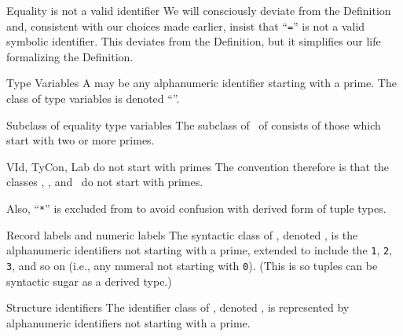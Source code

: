 \begin{deviation}{Equality is not a valid identifier}
We will consciously deviate from the Definition and, consistent with our
choices made earlier, insist that ``\texttt{=}'' is not a valid symbolic
identifier. This deviates from the Definition, but it simplifies our
life formalizing the Definition.
\end{deviation}

\begin{definition}{Type Variables}
A  may be any alphanumeric identifier starting
with a prime. The class of type variables is denoted ``{\TyVar}''.
\end{definition}

\begin{definition}{Subclass of equality type variables}\label{defn:syntax-core:etyvar}
The subclass of  \EtyVar\ of {\TyVar}
consists of those which start with two or more primes.
\end{definition}

\begin{convention}{VId, TyCon, Lab do not start with primes}
The convention therefore is that the classes \VId, \TyCon, and \Lab\ do
not start with primes.

Also, ``\texttt{*}'' is excluded from {\TyCon} to avoid confusion with
derived form of tuple types.
\end{convention}

\begin{definition}{Record labels and numeric labels}\label{defn:record-and-numeric-labels}
The syntactic class of , denoted {\Lab}, is
the alphanumeric identifiers not starting with a prime, extended to
include the  \texttt{1}, \texttt{2}, \texttt{3},
and so on (i.e., any numeral not starting with \texttt{0}).
(This is so tuples can be syntactic sugar as a derived type.)
\end{definition}

\begin{definition}{Structure identifiers}
The identifier class of , denoted \StrId,
is represented by alphanumeric identifiers not starting with a prime.
\end{definition}

